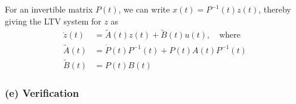 For an invertible matrix \( P(t) \), we can write \( x(t) = P^{-1}(t) z(t) \), thereby giving the LTV system for \( z \) as
\[
    \boxed{
        \begin{aligned}
            \dot{z}(t)
             & =
            \tilde{A}(t) z(t) + \tilde{B}(t) u(t), \quad \text{where}
            \\
            \tilde{A}(t)
             & =
            \dot{P}(t) P^{-1}(t) + P(t) A(t) P^{-1}(t)
            \\
            \tilde{B}(t)
             & =
            P(t) B(t)
        \end{aligned}
    }
\]

\subsubsection*{(e) Verification}

